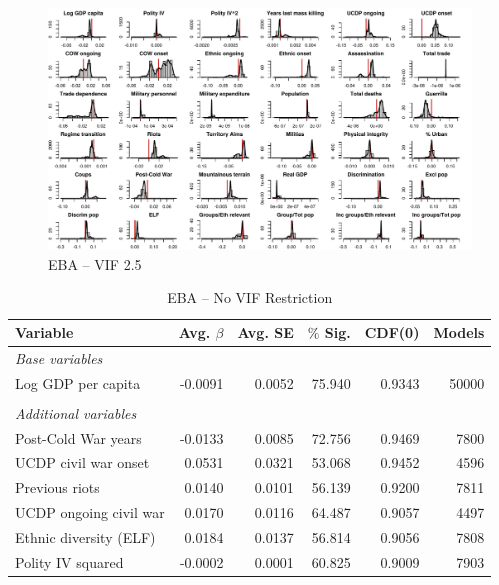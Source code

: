 \clearpage
\begin{figure}
    \centering
    \includegraphics[width=\textwidth]{images/mk-high-vif.pdf}
    \caption{EBA -- VIF 2.5}
    \label{fig:mk-low-vif}
\end{figure}
\clearpage

\begin{table}[H]
\centering
\begin{tabular}{lrrrrr}
\hline
\textbf{Variable} & \textbf{Avg. $\beta$} & \textbf{Avg. SE} & \textbf{$\%$ Sig.} & \textbf{CDF(0)} & \textbf{Models} \\ \hline
\textit{Base variables} &  &  &  &  &  \\
Log GDP per capita & -0.0091 & 0.0052 & 75.940 & 0.9343 & 50000 \\
 &  &  &  &  &  \\
\textit{Additional variables} &  &  &  &  &  \\
Post-Cold War years & -0.0133 & 0.0085 & 72.756 & 0.9469 & 7800 \\
UCDP civil war onset & 0.0531 & 0.0321 & 53.068 & 0.9452 & 4596 \\
Previous riots & 0.0140 & 0.0101 & 56.139 & 0.9200 & 7811 \\
UCDP ongoing civil war & 0.0170 & 0.0116 & 64.487 & 0.9057 & 4497 \\
Ethnic diversity (ELF) & 0.0184 & 0.0137 & 56.814 & 0.9056 & 7808 \\
Polity IV squared & -0.0002 & 0.0001 & 60.825 & 0.9009 & 7903 \\ \hline
\end{tabular}
\caption{EBA -- No VIF Restriction}
\label{tab:mk-no-vif}
\end{table}

